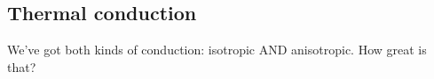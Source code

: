 \subsection{Thermal conduction}
\label{sec.num.conductions}

We've got both kinds of conduction: isotropic AND anisotropic.  How
great is that?

